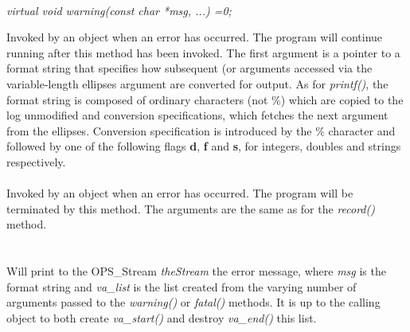   \\
{\em virtual void warning(const char *msg, ...) =0;}

Invoked by an object when an error has occurred. The program will
continue running after this method has been invoked. The first
argument is a pointer to a format string that specifies how
subsequent (or arguments accessed via the variable-length ellipses
argument are converted for output. As for {\em printf()}, the format
string is composed of ordinary characters (not \%) which are copied to
the log unmodified and conversion specifications, which fetches the
next argument from the ellipses. Conversion specification is
introduced by the \% character and followed by one of the following
flags {\bf d}, {\bf f} and {\bf s}, for integers, doubles and strings
respectively. \\


\\ 
Invoked by an object when an error has occurred. The program will be
terminated by this method. The arguments are the same as for the {\em
record()} method.\\ 

  \\
\\ 
Will print to the OPS_Stream {\em theStream} the error message, where
{\em msg} is the format string  and {\em va\_list} is the list created
from the varying number of arguments passed to the {\em warning()} or
{\em fatal()} methods. It is up to the calling object to both create
{\em va\_start()} and destroy {\em va\_end()} this list. 

